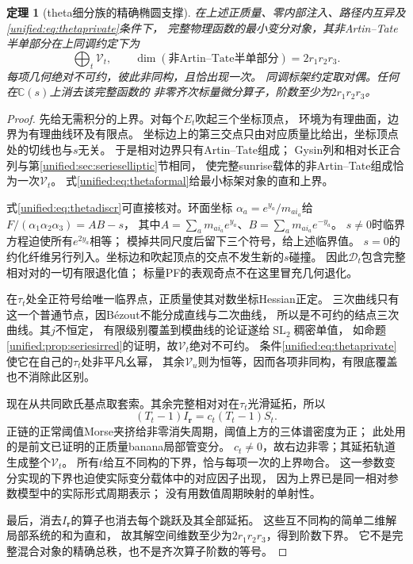 \documentclass[11pt,a4paper,oneside]{ctexart}
\theoremstyle{cnplain}
\newtheorem{theorem}{定理}[section]
\theoremstyle{definition}
\theoremstyle{remark}
\numberwithin{equation}{section}
\begin{document}
\begin{theorem}[theta细分族的精确椭圆支撑]\label{unified:thm:thetavisible}
在上述正质量、零内部注入、路径内互异及\eqref{unified:eq:thetaprivate}条件下，
完整物理函数的最小变分对象，其非Artin--Tate半单部分在上同调约定下为
\begin{equation}\label{unified:eq:thetass}
       \bigoplus_t\mathcal V_t,\qquad
       \dim(\text{非Artin--Tate半单部分})=2r_1r_2r_3 .
\end{equation}
每项几何绝对不可约，彼此非同构，且恰出现一次。
同调标架约定取对偶。任何在$\mathbb C(s)$上消去该完整函数的
非零齐次标量微分算子，阶数至少为$2r_1r_2r_3$。
\end{theorem}
\begin{proof}
先给无需积分的上界。对每个$E_t$吹起三个坐标顶点，
环境为有理曲面，边界为有理曲线环及有限点。
坐标边上的第三交点只由对应质量比给出，坐标顶点处的切线也与$s$无关。
于是相对边界只有Artin--Tate组成；
Gysin列和相对长正合列与第\ref{unified:sec:serieselliptic}节相同，
使完整sunrise载体的非Artin--Tate组成恰为一次$\mathcal V_t$。
式\eqref{unified:eq:thetaformal}给最小标架对象的直和上界。

式\eqref{unified:eq:thetadiscr}可直接核对。环面坐标
$\alpha_a=e^{y_a}/m_{ai_a}$给
$F/(\alpha_1\alpha_2\alpha_3)=AB-s$，
其中$A=\sum_a m_{ai_a}e^{y_a}$、$B=\sum_a m_{ai_a}e^{-y_a}$。
$s\ne0$时临界方程迫使所有$e^{2y_a}$相等；
模掉共同尺度后留下三个符号，给上述临界值。
$s=0$的约化纤维另行列入。坐标边和吹起顶点的交点不发生新的$s$碰撞。
因此$\mathcal D_t$包含完整相对对的一切有限退化值；
标量PF的表观奇点不在这里冒充几何退化。

在$\tau_t$处全正符号给唯一临界点，正质量使其对数坐标Hessian正定。
三次曲线只有这一个普通节点，因Bézout不能分成直线与二次曲线，
所以是不可约的结点三次曲线。其$j$不恒定，
有限级别覆盖到模曲线的论证遂给$\operatorname{SL}_2$稠密单值，
如命题\ref{unified:prop:seriesirred}的证明，故$\mathcal V_t$绝对不可约。
条件\eqref{unified:eq:thetaprivate}使它在自己的$\tau_t$处非平凡幺幂，
其余$\mathcal V_u$则为恒等，因而各项非同构，有限底覆盖也不消除此区别。

现在从共同欧氏基点取套索。其余完整相对对在$\tau_t$光滑延拓，所以
\[
 (T_t-1)I_{\mathbf r}=c_t(T_t-1)S_t .
\]
正链的正常阈值Morse夹挤给非零消失周期，阈值上方的三体谱密度为正；
此处用的是前文已证明的正质量banana局部管变分。
$c_t\ne0$，故右边非零；其延拓轨道生成整个$\mathcal V_t$。
所有$t$给互不同构的下界，恰与每项一次的上界吻合。
这一参数变分实现的下界也迫使实际变分载体中的对应因子出现，
因为上界已是同一相对参数模型中的实际形式周期表示；
没有用数值周期映射的单射性。

最后，消去$I_{\mathbf r}$的算子也消去每个跳跃及其全部延拓。
这些互不同构的简单二维解局部系统的和为直和，
故其解空间维数至少为$2r_1r_2r_3$，得到阶数下界。
它不是完整混合对象的精确总秩，也不是齐次算子阶数的等号。
\end{proof}
\end{document}
